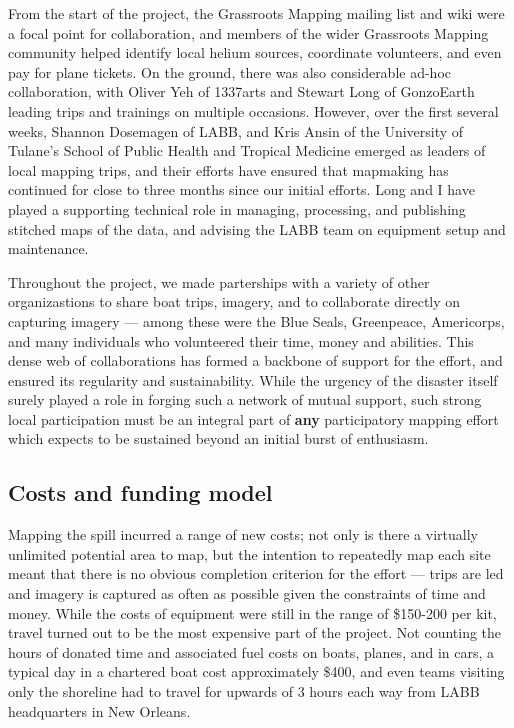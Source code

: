 \documentclass[11pt,oneside,notitlepage]{report}
\begin{document}
{{From the start of the project, the Grassroots Mapping mailing list and wiki were a focal point for collaboration, and members of the wider Grassroots Mapping community helped identify local helium sources, coordinate volunteers, and even pay for plane tickets. On the ground, there was also considerable ad-hoc collaboration, with Oliver Yeh of 1337arts and Stewart Long of GonzoEarth leading trips and trainings on multiple occasions. However, over the first several weeks, Shannon Dosemagen of \ac{LABB}, and Kris Ansin of the University of Tulane's School of Public Health and Tropical Medicine emerged as leaders of local mapping trips, and their efforts have ensured that mapmaking has continued for close to three months since our initial efforts. Long and I have played a supporting technical role in managing, processing, and publishing stitched maps of the data, and advising the \ac{LABB} team on equipment setup and maintenance. 

Throughout the project, we made parterships with a variety of other organizastions to share boat trips, imagery, and to collaborate directly on capturing imagery --- among these were the Blue Seals, Greenpeace, Americorps, and many individuals who volunteered their time, money and abilities. This dense web of collaborations has formed a backbone of support for the effort, and ensured its regularity and sustainability. While the urgency of the disaster itself surely played a role in forging such a network of mutual support, such strong local participation must be an integral part of \textbf{any} participatory mapping effort which expects to be sustained beyond an initial burst of enthusiasm.

\subsection{Costs and funding model}
\label{subsec:kickstarter}

Mapping the spill incurred a range of new costs; not only is there a virtually unlimited potential area to map, but the intention to repeatedly map each site meant that there is no obvious completion criterion for the effort --- trips are led and imagery is captured as often as possible given the constraints of time and money. While the costs of equipment were still in the range of \$150-200 per kit, travel turned out to be the most expensive part of the project. Not counting the hours of donated time and associated fuel costs on boats, planes, and in cars, a typical day in a chartered boat cost approximately \$400, and even teams visiting only the shoreline had to travel for upwards of 3 hours each way from \ac{LABB} headquarters in New Orleans. 

}}
\end{document}
